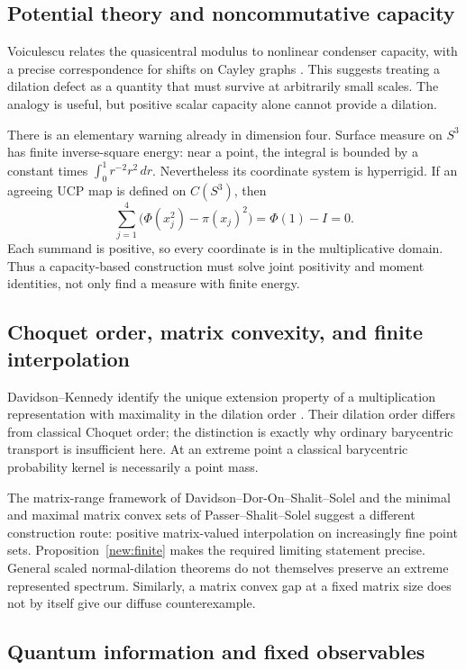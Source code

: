 \documentclass[11pt,letterpaper]{amsart}
\theoremstyle{definition}
\theoremstyle{remark}
\numberwithin{equation}{section}
\begin{document}
\subsection{Potential theory and noncommutative capacity}

Voiculescu relates the quasicentral modulus to nonlinear condenser
capacity, with a precise correspondence for shifts on Cayley graphs
\cite{Voi}. This suggests treating a dilation defect as a quantity that
must survive at arbitrarily small scales. The analogy is useful, but
positive scalar capacity alone cannot provide a dilation.

There is an elementary warning already in dimension four. Surface
measure on $S^3$ has finite inverse-square energy: near a point, the
integral is bounded by a constant times
$\int_0^1 r^{-2}r^2\,dr$. Nevertheless its coordinate system is
hyperrigid. If an agreeing UCP map is defined on $C(S^3)$, then
\[
 \sum_{j=1}^4\bigl(\Phi(x_j^2)-\pi(x_j)^2\bigr)
       =\Phi(1)-I=0.
\]
Each summand is positive, so every coordinate is in the multiplicative
domain. Thus a capacity-based construction must solve joint positivity
and moment identities, not only find a measure with finite energy.

\subsection{Choquet order, matrix convexity, and finite interpolation}

Davidson--Kennedy identify the unique extension property of a
multiplication representation with maximality in the dilation order
\cite[Theorem 7.6]{DK}. Their dilation order differs from classical
Choquet order; the distinction is exactly why ordinary barycentric
transport is insufficient here. At an extreme point a classical
barycentric probability kernel is necessarily a point mass.

The matrix-range framework of Davidson--Dor-On--Shalit--Solel
\cite{DDSS} and the minimal and maximal matrix convex sets of
Passer--Shalit--Solel \cite{PSS} suggest a different construction route:
positive matrix-valued interpolation on increasingly fine point sets.
Proposition~\ref{new:finite} makes the required limiting statement
precise. General scaled normal-dilation theorems do not themselves
preserve an extreme represented spectrum. Similarly, a matrix convex
gap at a fixed matrix size does not by itself give our diffuse
counterexample.

\subsection{Quantum information and fixed observables}
\end{document}

